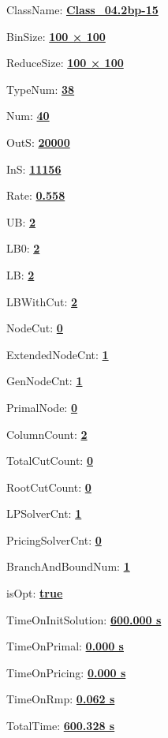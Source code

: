\documentclass[11pt]{article}
\begin{document}
\pagestyle{empty}


ClassName: \underline{\textbf{Class_04.2bp-15}}
\par
BinSize: \underline{\textbf{100 × 100}}
\par
ReduceSize: \underline{\textbf{100 × 100}}
\par
TypeNum: \underline{\textbf{38}}
\par
Num: \underline{\textbf{40}}
\par
OutS: \underline{\textbf{20000}}
\par
InS: \underline{\textbf{11156}}
\par
Rate: \underline{\textbf{0.558}}
\par
UB: \underline{\textbf{2}}
\par
LB0: \underline{\textbf{2}}
\par
LB: \underline{\textbf{2}}
\par
LBWithCut: \underline{\textbf{2}}
\par
NodeCut: \underline{\textbf{0}}
\par
ExtendedNodeCnt: \underline{\textbf{1}}
\par
GenNodeCnt: \underline{\textbf{1}}
\par
PrimalNode: \underline{\textbf{0}}
\par
ColumnCount: \underline{\textbf{2}}
\par
TotalCutCount: \underline{\textbf{0}}
\par
RootCutCount: \underline{\textbf{0}}
\par
LPSolverCnt: \underline{\textbf{1}}
\par
PricingSolverCnt: \underline{\textbf{0}}
\par
BranchAndBoundNum: \underline{\textbf{1}}
\par
isOpt: \underline{\textbf{true}}
\par
TimeOnInitSolution: \underline{\textbf{600.000 s}}
\par
TimeOnPrimal: \underline{\textbf{0.000 s}}
\par
TimeOnPricing: \underline{\textbf{0.000 s}}
\par
TimeOnRmp: \underline{\textbf{0.062 s}}
\par
TotalTime: \underline{\textbf{600.328 s}}
\par
\newpage
\end{document}
